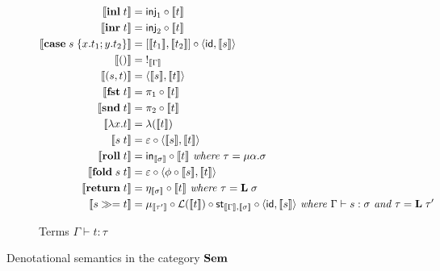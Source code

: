 \begin{figure}
\begin{subfigure}{\linewidth}
\begin{align*}
  \\
  \sem{\tmInl{t}} &= \mathsf{inj}_1 \comp \sem{t}
  \\
  \sem{\tmInr{t}} &= \mathsf{inj}_2 \comp \sem{t}
  \\
  \sem{\tmCase{s}{x}{t_1}{y}{t_2}} &= \coprodM{\sem{t_1}}{\sem{t_2}} \comp \prodM{\id}{\sem{s}}
  \\
  \sem{\tmUnit} &=\;!_{\sem{\Gamma}}
  \\
  \sem{\tmPair{s}{t}} &= \prodM{\sem{s}}{\sem{t}}
  \\
  \sem{\tmFst{t}} &= \pi_1 \comp \sem{t}
  \\
  \sem{\tmSnd{t}} &= \pi_2 \comp \sem{t}
  \\
  \sem{\tmFun{x}{t}} &= \lambda(\sem{t})
  \\
  \sem{\tmApp{s}{t}} &= \eval \comp \prodM{\sem{s}}{\sem{t}}
  \\
  \sem{\tmRoll{t}} &= \inMap_{\sem{\sigma}} \comp \sem{t}
  \textit{ where }\tau = \mu\alpha.\sigma
  \\
  \sem{\tmFold{s}{t}} &= \eval \comp \prodM{\phi \comp \sem{s}}{\sem{t}}
  \\
  \sem{\tmReturn{t}} &= \eta_{\sem{\sigma}} \comp \sem{t}
  \textit{ where }\tau = \tyLift\;\sigma
  \\
  \sem{\tmBind{s}{t}} &= \mu_{\sem{\tau'}} \comp \mathcal{L}(\sem{t}) \comp \mathsf{st}_{\sem{\Gamma},\sem{\sigma}} \comp \prodM{\id}{\sem{s}}
  \textit{ where }\Gamma \vdash s: \sigma\textit{ and }\tau = \tyLift\;\tau'
  \end{align*}
  \caption{Terms $\Gamma \vdash t: \tau$}
  \label{fig:default-semantics:terms}
\end{subfigure}
\caption{Denotational semantics in the category $\Sem$}
\end{figure}
